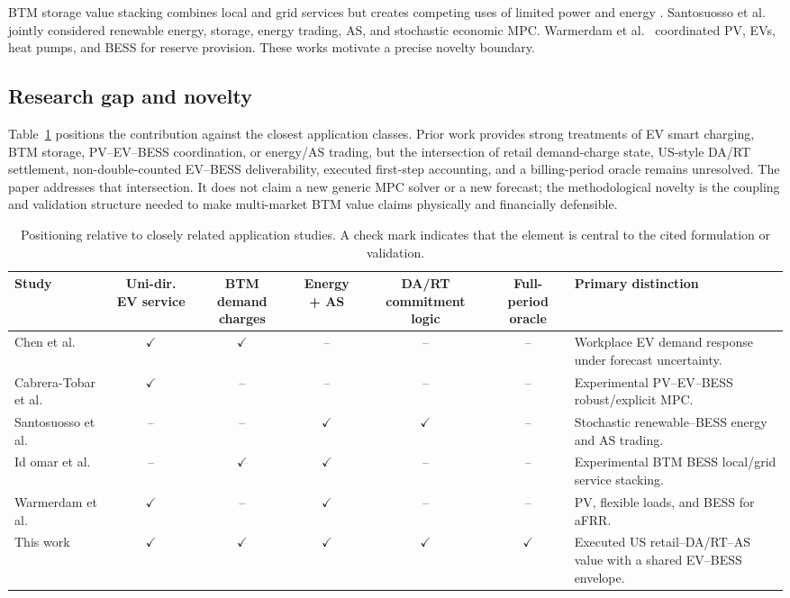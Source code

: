 \documentclass[final,5p,times]{elsarticle}
\begin{document}
BTM storage value stacking combines local and grid services but creates competing uses of limited power and energy \cite{chen2021valueStacking,raoufat2018bess,idomar2026stacked}. Santosuosso et al.~\cite{santosuosso2024sempc} jointly considered renewable energy, storage, energy trading, AS, and stochastic economic MPC. Warmerdam et al.~\cite{warmerdam2026power} coordinated PV, EVs, heat pumps, and BESS for reserve provision. These works motivate a precise novelty boundary.

\subsection{Research gap and novelty}
Table~\ref{tab:literature_gap} positions the contribution against the closest
application classes. Prior work provides strong treatments of EV smart
charging, BTM storage, PV--EV--BESS coordination, or energy/AS trading, but the
intersection of retail demand-charge state, US-style DA/RT settlement,
non-double-counted EV--BESS deliverability, executed first-step accounting, and
a billing-period oracle remains unresolved. The paper addresses that
intersection. It does not claim a new generic MPC solver or a new forecast; the
methodological novelty is the coupling and validation structure needed to make
multi-market BTM value claims physically and financially defensible.

\begin{table}[!t]
\centering
\caption{Positioning relative to closely related application studies. A check mark indicates that the element is central to the cited formulation or validation.}
\label{tab:literature_gap}
\scriptsize
\begin{tabularx}{\textwidth}{@{}p{}cccccX@{}}
\toprule
Study & Uni-dir. EV service & BTM demand charges & Energy + AS & DA/RT commitment logic & Full-period oracle & Primary distinction \\
\midrule
Chen et al.~\cite{chen2024costoptimal,chen2026realtime} & $\checkmark$ & $\checkmark$ & -- & -- & -- & Workplace EV demand response under forecast uncertainty.\\
Cabrera-Tobar et al.~\cite{cabrera2022realtime,cabrera2024robust} & $\checkmark$ & -- & -- & -- & -- & Experimental PV--EV--BESS robust/explicit MPC.\\
Santosuosso et al.~\cite{santosuosso2024sempc} & -- & -- & $\checkmark$ & $\checkmark$ & -- & Stochastic renewable--BESS energy and AS trading.\\
Id omar et al.~\cite{idomar2026stacked} & -- & $\checkmark$ & $\checkmark$ & -- & -- & Experimental BTM BESS local/grid service stacking.\\
Warmerdam et al.~\cite{warmerdam2026power} & $\checkmark$ & -- & $\checkmark$ & -- & -- & PV, flexible loads, and BESS for aFRR.\\
This work & $\checkmark$ & $\checkmark$ & $\checkmark$ & $\checkmark$ & $\checkmark$ & Executed US retail--DA/RT--AS value with a shared EV--BESS envelope.\\
\bottomrule
\end{tabularx}
\end{table}
\end{document}

